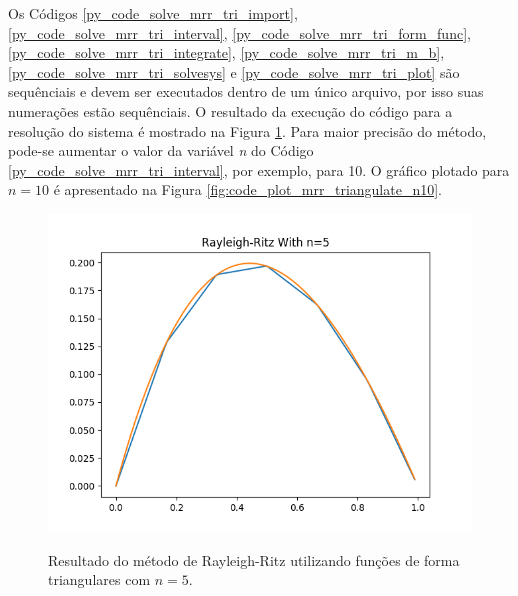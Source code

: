 \documentclass[
	12pt,				%
	openright,			%
    twoside,			%
	a4paper,			%
	english,			%
	french,				%
	spanish,			%
	brazil				%
	]{abntex2}
\numberwithin{lema}{chapter}
\numberwithin{teorema}{chapter}
\numberwithin{definicao}{chapter}
\numberwithin{exemplo}{chapter}
\numberwithin{figure}{chapter}
\begin{document}
Os Códigos \ref{py_code_solve_mrr_tri_import}, \ref{py_code_solve_mrr_tri_interval}, \ref{py_code_solve_mrr_tri_form_func}, \ref{py_code_solve_mrr_tri_integrate}, \ref{py_code_solve_mrr_tri_m_b}, \ref{py_code_solve_mrr_tri_solvesys} e \ref{py_code_solve_mrr_tri_plot} são sequênciais e devem ser executados dentro de um único arquivo, por isso suas numerações estão sequênciais. O resultado da execução do código para a resolução do sistema é mostrado na Figura \ref{fig:code_plot_mrr_triangulate}. Para maior precisão do método, pode-se aumentar o valor da variável \textit{n} do Código \ref{py_code_solve_mrr_tri_interval}, por exemplo, para 10. O gráfico plotado para $n=10$ é apresentado na Figura \ref{fig:code_plot_mrr_triangulate_n10}.

\begin{figure}[h]
	\caption{Resultado do método de Rayleigh-Ritz utilizando funções de forma triangulares com $n=5$.}
	\centering
	\includegraphics[scale=0.6]{../figuras/code/code_plot_mrr_triangulate.png}
	\label{fig:code_plot_mrr_triangulate}
\end{figure}
\end{document}
